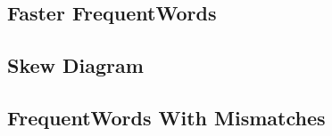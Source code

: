 

\subsection{Faster FrequentWords}



\subsection{Skew Diagram}



\subsection{FrequentWords With Mismatches}



